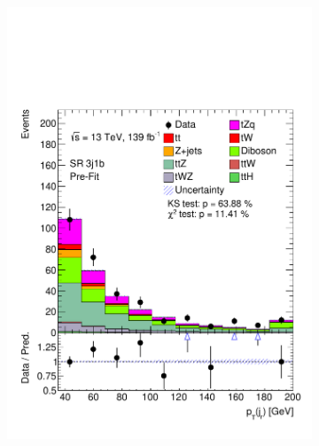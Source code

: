 \begin{figure}[!h]
\begin{subfigure}[b]{0.33\linewidth}
    \includegraphics[width=\linewidth]{ubonn-thesis/Chapters/Chapters_06/Figure/Input_distribution/SR_3j1b_ptjf.pdf} 
  \end{subfigure} 
  \newline
  \vspace*{0.4cm}
  \begin{subfigure}[b]{0.33\linewidth}
    \centering

\end{subfigure}
\end{figure}
